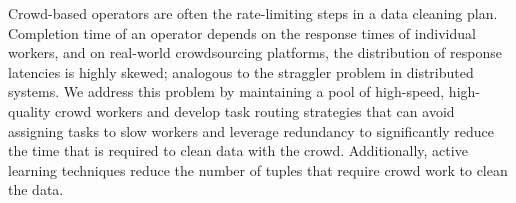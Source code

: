 

Crowd-based operators are often the rate-limiting steps in a data cleaning plan.
Completion time of an operator depends on the response times of individual workers, and on real-world crowdsourcing 
platforms, the distribution of response latencies is highly skewed; analogous to the straggler problem in distributed systems.
We address this problem by maintaining a pool of high-speed, high-quality crowd workers and develop task routing strategies 
that can avoid assigning tasks to slow workers and leverage redundancy to significantly reduce the time that is required to clean 
data with the crowd. Additionally, active learning techniques reduce the number of tuples that require crowd work to clean the
data.

